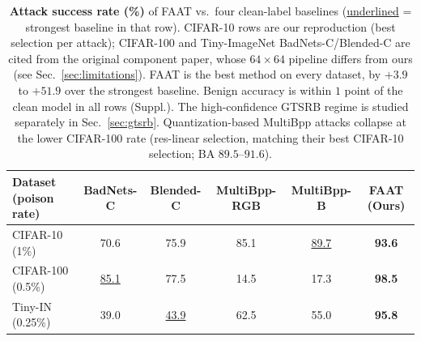 \begin{table}[t]
\centering
\small
\setlength{\tabcolsep}{6pt}
\begin{tabular}{l c c c c c}
\toprule
Dataset (poison rate) & BadNets-C & Blended-C & MultiBpp-RGB & MultiBpp-B & \textbf{FAAT (Ours)} \\
\midrule
CIFAR-10  (1\%)    & 70.6 & 75.9 & 85.1 & \underline{89.7} & \textbf{93.6} \\
CIFAR-100 (0.5\%)  & \underline{85.1} & 77.5 & 14.5 & 17.3 & \textbf{98.5} \\
Tiny-IN   (0.25\%) & 39.0 & \underline{43.9} & 62.5 & 55.0 & \textbf{95.8} \\
\bottomrule
\end{tabular}
\caption{\textbf{Attack success rate (\%)} of FAAT vs.\ four clean-label
baselines (\underline{underlined} = strongest baseline in that row). CIFAR-10
rows are our reproduction (best selection per attack); CIFAR-100 and
Tiny-ImageNet BadNets-C/Blended-C are cited from the original component paper,
whose $64{\times}64$ pipeline differs from ours (see Sec.~\ref{sec:limitations}).
FAAT is the best method on every dataset, by $+3.9$ to $+51.9$ over the
strongest baseline. Benign accuracy is within $1$ point of the clean model in
all rows (Suppl.). The high-confidence GTSRB regime is studied separately in
Sec.~\ref{sec:gtsrb}. Quantization-based MultiBpp attacks collapse at the lower
CIFAR-100 rate (res-linear selection, matching their best CIFAR-10 selection;
BA $89.5$--$91.6$).}
\label{tab:main}
\end{table}
